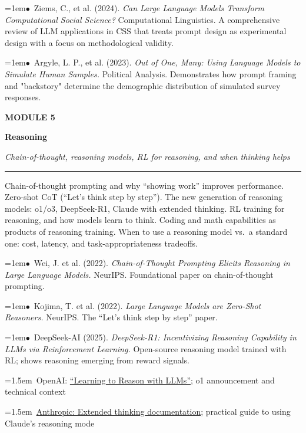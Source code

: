\documentclass[11pt, a4paper]{article}
\newcommand{\modulehead}[3]{%
  \vspace{0.5em}
  {\small\sffamily\bfseries\textcolor{accent}{MODULE #1}}\par\vspace{-0.3em}
  {\Large\sffamily\bfseries\textcolor{dark}{#2}}\par\vspace{-0.2em}
  {\small\textit{\textcolor{muted}{#3}}}\par
  \vspace{0.2em}\textcolor{bordercol}{\rule{\textwidth}{0.3pt}}\par
}
\newcommand{\seclabel}[1]{%
  \vspace{0.6em}{\normalsize\sffamily\bfseries\textcolor{accent}{#1}}\par\vspace{0.2em}
}
\newcommand{\refpaper}[1]{%
  \par\hangindent=1em\hangafter=1\noindent\textcolor{accent}{\small$\bullet$}~{\small #1}\par
}
\newcommand{\resource}[1]{%
  \par\hangindent=1.5em\hangafter=1\noindent\hspace{0.5em}{\small\textcolor{accent}{\guilsinglright}}~{\small #1}\par
}
\begin{document}
\seclabel{Social Science Applicaitons}

\refpaper{Ziems, C., et al. (2024). \textit{Can Large Language Models Transform Computational Social Science?} Computational Linguistics. A comprehensive review of LLM applications in CSS that treats prompt design as experimental design with a focus on methodological validity.}

\refpaper{Argyle, L. P., et al. (2023). \textit{Out of One, Many: Using Language Models to Simulate Human Samples.} Political Analysis. Demonstrates how prompt framing and "backstory" determine the demographic distribution of simulated survey responses.}

\vspace{1.5em}

\modulehead{5}{Reasoning}{Chain-of-thought, reasoning models, RL for reasoning, and when thinking helps}

\seclabel{Core Concepts}

Chain-of-thought prompting and why ``showing work'' improves performance. Zero-shot CoT (``Let's think step by step''). The new generation of reasoning models: o1/o3, DeepSeek-R1, Claude with extended thinking. RL training for reasoning, and how models learn to think. Coding and math capabilities as products of reasoning training. When to use a reasoning model vs.\ a standard one: cost, latency, and task-appropriateness tradeoffs.

\seclabel{Core Readings}

\refpaper{Wei, J. et al. (2022). \textit{Chain-of-Thought Prompting Elicits Reasoning in Large Language Models.} NeurIPS. Foundational paper on chain-of-thought prompting.}

\refpaper{Kojima, T. et al. (2022). \textit{Large Language Models are Zero-Shot Reasoners.} NeurIPS. The ``Let's think step by step'' paper.}

\refpaper{DeepSeek-AI (2025). \textit{DeepSeek-R1: Incentivizing Reasoning Capability in LLMs via Reinforcement Learning.} Open-source reasoning model trained with RL; shows reasoning emerging from reward signals.}

\seclabel{Further Resources}

\resource{OpenAI: \href{https://openai.com/index/learning-to-reason-with-llms/}{``Learning to Reason with LLMs''}; o1 announcement and technical context}

\resource{\href{https://docs.anthropic.com/en/docs/build-with-claude/extended-thinking}{Anthropic: Extended thinking documentation}; practical guide to using Claude's reasoning mode}
\end{document}
